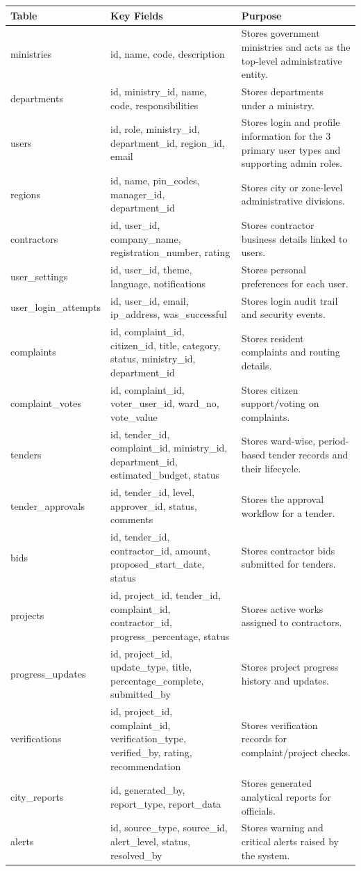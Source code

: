 \documentclass[12pt,a4paper,oneside,openany]{report}
\begin{document}
\begin{longtable}{p{3.0cm} p{4.3cm} p{7.0cm}}
\toprule
\textbf{Table} & \textbf{Key Fields} & \textbf{Purpose} \\
\midrule
\endhead
ministries & id, name, code, description & Stores government ministries and acts as the top-level administrative entity. \\
departments & id, ministry\_id, name, code, responsibilities & Stores departments under a ministry. \\
users & id, role, ministry\_id, department\_id, region\_id, email & Stores login and profile information for the 3 primary user types and supporting admin roles. \\
regions & id, name, pin\_codes, manager\_id, department\_id & Stores city or zone-level administrative divisions. \\
contractors & id, user\_id, company\_name, registration\_number, rating & Stores contractor business details linked to users. \\
user\_settings & id, user\_id, theme, language, notifications & Stores personal preferences for each user. \\
user\_login\_attempts & id, user\_id, email, ip\_address, was\_successful & Stores login audit trail and security events. \\
complaints & id, complaint\_id, citizen\_id, title, category, status, ministry\_id, department\_id & Stores resident complaints and routing details. \\
complaint\_votes & id, complaint\_id, voter\_user\_id, ward\_no, vote\_value & Stores citizen support/voting on complaints. \\
tenders & id, tender\_id, complaint\_id, ministry\_id, department\_id, estimated\_budget, status & Stores ward-wise, period-based tender records and their lifecycle. \\
tender\_approvals & id, tender\_id, level, approver\_id, status, comments & Stores the approval workflow for a tender. \\
bids & id, tender\_id, contractor\_id, amount, proposed\_start\_date, status & Stores contractor bids submitted for tenders. \\
projects & id, project\_id, tender\_id, complaint\_id, contractor\_id, progress\_percentage, status & Stores active works assigned to contractors. \\
progress\_updates & id, project\_id, update\_type, title, percentage\_complete, submitted\_by & Stores project progress history and updates. \\
verifications & id, project\_id, complaint\_id, verification\_type, verified\_by, rating, recommendation & Stores verification records for complaint/project checks. \\
city\_reports & id, generated\_by, report\_type, report\_data & Stores generated analytical reports for officials. \\
alerts & id, source\_type, source\_id, alert\_level, status, resolved\_by & Stores warning and critical alerts raised by the system. \\
\bottomrule
\end{longtable}
\end{document}
